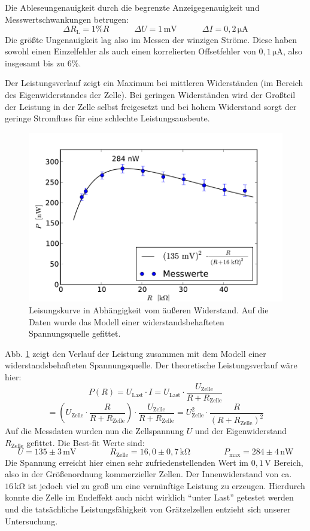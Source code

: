 \documentclass[11pt]{scrartcl}
\newcommand{\unit}[1]{\ensuremath{\,\mathrm{#1}}} %
\begin{document}
Die Ableseungenauigkeit durch die begrenzte Anzeigegenauigkeit und Messwertschwankungen betrugen:
\[
\Delta R_{\text{L}} = 1\% R
\qquad\quad
\Delta U = 1\unit{mV}
\qquad\quad
\Delta I = 0,2\unit{\mu A}
\]
Die größte Ungenauigkeit lag also im Messen der winzigen Ströme. Diese haben sowohl einen Einzelfehler als auch einen korrelierten Offsetfehler von $0,1\unit{\mu A}$, also insgesamt bis zu 6\%.

Der Leistungsverlauf zeigt ein Maximum bei mittleren Widerständen (im Bereich des Eigenwiderstandes der Zelle). Bei geringen Widerständen wird der Großteil der Leistung in der Zelle selbst freigesetzt und bei hohem Widerstand sorgt der geringe Stromfluss für eine schlechte Leistungsausbeute.
\begin{figure}[ht]
\begin{center}
\includegraphics[width=1.0\textwidth]{images/graetzel_leistung.pdf}
\end{center}
\vspace{-1.5\baselineskip}
\caption{Leisungskurve in Abhängigkeit vom äußeren Widerstand. Auf die Daten wurde das Modell einer widerstandsbehafteten Spannungsquelle gefittet.}
\label{leistungskurve}
\end{figure}
Abb. \ref{leistungskurve} zeigt den Verlauf der Leistung zusammen mit dem Modell einer widerstandsbehafteten Spannungsquelle. Der theoretische Leistungsverlauf wäre hier:
\[
P(R)= U_{\text{Last}}\cdot I
= U_{\text{Last}}\cdot \frac{U_{\text{Zelle}}}{R+R_{\text{Zelle}}}
\]
\[
= \left(U_{\text{Zelle}}\cdot \frac{R}{R+R_{\text{Zelle}}}\right)\cdot \frac{U_{\text{Zelle}}}{R+R_{\text{Zelle}}}
= U_{\text{Zelle}}^2\cdot \frac{R}{(R+R_{\text{Zelle}})^2}
\]
Auf die Messdaten wurden nun die Zellspannung $U$ und der Eigenwiderstand $R_{\text{Zelle}}$ gefittet. Die Best-fit Werte sind:
\[
U = 135 \pm 3\unit{mV}
\qquad\qquad
R_{\text{Zelle}} = 16,0 \pm 0,7\unit{k\Omega}
\qquad\qquad
P_{\text{max}} = 284 \pm 4\unit{nW}
\]
Die Spannung erreicht hier einen sehr zufriedenstellenden Wert im $0,1\unit{V}$ Bereich, also in der Größenordnung kommerzieller Zellen. Der Innenwiderstand von ca. $16\unit{k\Omega}$ ist jedoch viel zu groß um eine vernünftige Leistung zu erzeugen. Hierdurch konnte die Zelle im Endeffekt auch nicht wirklich "`unter Last"' getestet werden und die tatsächliche Leistungsfähigkeit von Grätzelzellen entzieht sich unserer Untersuchung.
\end{document}
